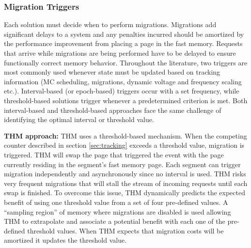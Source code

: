 \subsubsection{Migration Triggers}

Each solution must decide when to perform migrations. 
Migrations add significant delays to a system and any penalties incurred should be amortized by the performance improvement from placing a page in the fast memory. Requests that arrive while migrations are being performed have to be delayed to ensure functionally correct memory behavior. Throughout the literature, two triggers are most commonly used whenever state must be updated based on tracking information (MC scheduling, migrations, dynamic voltage and frequency scaling etc.). Interval-based (or epoch-based) triggers occur with a set frequency, while threshold-based solutions trigger whenever a predetermined criterion is met. 
Both interval-based and threshold-based approaches face the same challenge of identifying the optimal interval or threshold value. 


	\textbf{THM approach:} THM uses a threshold-based mechanism. When the competing counter described in section \ref{sec:tracking} exceeds a threshold value, migration is triggered. THM will swap the page that triggered the event with the page currently residing in the segment's fast memory page. Each segment can trigger migration independently and asynchronously since no interval is used. THM risks very frequent migrations that will stall the stream of incoming requests until each swap is finished. To overcome this issue, THM dynamically predicts the expected benefit of using one threshold value from a set of four pre-defined values. A ``sampling region'' of memory where migrations are disabled is used allowing THM to extrapolate and associate a potential benefit with each one of the pre-defined threshold values. When THM expects that migration costs will be amortized it updates the threshold value.
	

